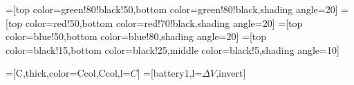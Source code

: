 


\usepackage{physics}
\usepackage{bm}
\usepackage{tikz}
\tikzset{>=latex} %
\usetikzlibrary{decorations.markings}
\usepackage{xcolor}
=[top color=green!80!black!50,bottom color=green!80!black,shading angle=20]
=[top color=red!50,bottom color=red!70!black,shading angle=20]
=[top color=blue!50,bottom color=blue!80,shading angle=20]
=[top color=black!15,bottom color=black!25,middle color=black!5,shading angle=10]


=[C,thick,color=Ccol,Ccol,l=$C$]
=[battery1,l=$\Delta V$,invert]


